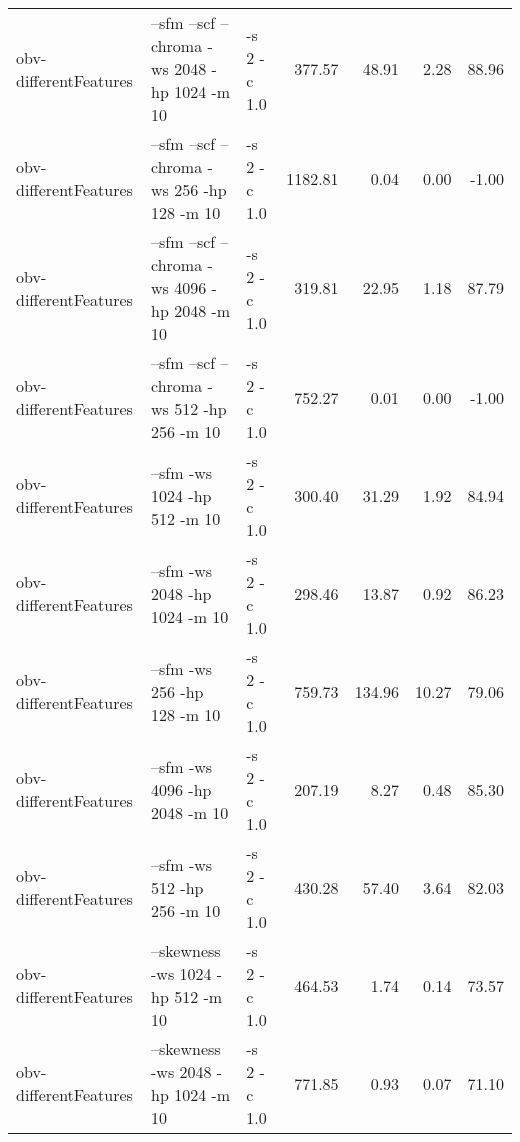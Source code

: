 \documentclass[11pt,a4paper]{article}
\begin{document}
\begin{tabular}{lllrrrr}
 obv-differentFeatures  &  --sfm --scf --chroma -ws 2048 -hp 1024 -m 10                                                                       &  -s 2 -c 1.0  &   377.57  &   48.91  &   2.28  &  88.96  \\
 obv-differentFeatures  &  --sfm --scf --chroma -ws 256 -hp 128 -m 10                                                                         &  -s 2 -c 1.0  &  1182.81  &    0.04  &   0.00  &  -1.00  \\
 obv-differentFeatures  &  --sfm --scf --chroma -ws 4096 -hp 2048 -m 10                                                                       &  -s 2 -c 1.0  &   319.81  &   22.95  &   1.18  &  87.79  \\
 obv-differentFeatures  &  --sfm --scf --chroma -ws 512 -hp 256 -m 10                                                                         &  -s 2 -c 1.0  &   752.27  &    0.01  &   0.00  &  -1.00  \\
 obv-differentFeatures  &  --sfm -ws 1024 -hp 512 -m 10                                                                                       &  -s 2 -c 1.0  &   300.40  &   31.29  &   1.92  &  84.94  \\
 obv-differentFeatures  &  --sfm -ws 2048 -hp 1024 -m 10                                                                                      &  -s 2 -c 1.0  &   298.46  &   13.87  &   0.92  &  86.23  \\
 obv-differentFeatures  &  --sfm -ws 256 -hp 128 -m 10                                                                                        &  -s 2 -c 1.0  &   759.73  &  134.96  &  10.27  &  79.06  \\
 obv-differentFeatures  &  --sfm -ws 4096 -hp 2048 -m 10                                                                                      &  -s 2 -c 1.0  &   207.19  &    8.27  &   0.48  &  85.30  \\
 obv-differentFeatures  &  --sfm -ws 512 -hp 256 -m 10                                                                                        &  -s 2 -c 1.0  &   430.28  &   57.40  &   3.64  &  82.03  \\
 obv-differentFeatures  &  --skewness -ws 1024 -hp 512 -m 10                                                                                  &  -s 2 -c 1.0  &   464.53  &    1.74  &   0.14  &  73.57  \\
 obv-differentFeatures  &  --skewness -ws 2048 -hp 1024 -m 10                                                                                 &  -s 2 -c 1.0  &   771.85  &    0.93  &   0.07  &  71.10  \\

\end{tabular}
\end{document}
